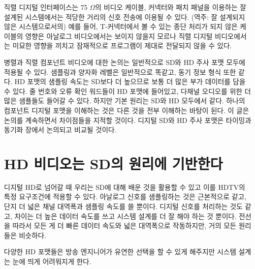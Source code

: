 직렬 디지털 인터페이스는 75 $\Omega$의 비디오 케이블, 커넥터와 패치 패널을 이용하는 잘 설계된 시스템에서는 적당한 거리의 신호 전송에 이용될 수 있다.
(역주: 잘 설계되지 않은 시스템으로서의) 예를 들어, T-커넥터에서 볼 수 있는 종단 처리가 되지 않은 케이블의 영향은 아날로그 비디오에서는 보이지 않을지 모르나 직렬 디지털 비디오에서는 미묘한 영향을 끼치고 잠재적으로 프로그램이 제대로 전달되지 않을 수 있다.

병렬과 직렬 컴포넌트 비디오에 대한 논의는 일반적으로 SD와 HD 주사 포맷 모두에 적용될 수 있다. 샘플링과 양자화 레벨은 일반적으로 똑같고, 동기 정보 형식 또한 같다. HD 포맷의 샘플링 속도는 SD보다 더 높으므로 보통 더 많은 부가 데이터를 담을 수 있다.
줄 번호와 오류 확인 워드들이 HD 포맷에 들어있고, 다채널 오디오를 위한 더 많은 샘플들도 들어갈 수 있다. 하지만 기본 원리는 SD와 HD 모두에서 같다. 하나의 컴포넌트 디지털 포맷을 이해하는 것은 다른 것을 전부 이해하는 바탕이 된다.
이 글은 논의를 계속하면서 차이점들을 지적할 것이다. 디지털 SD와 HD 주사 포맷은 타이밍과 동기화 장에서 논의되고 비교될 것이다.

\section{HD 비디오는 SD의 원리에 기반한다}
디지털 HD로 넘어갈 때 우리는 SD에 대해 배운 것을 활용할 수 있고 이를 HDTV의 특정 요구조건에 적용할 수 있다. 아날로그 신호를 샘플링하는 것은 근본적으로 같고, 단지 더 넓은 채널 대역폭과 샘플링 속도를 쓸 뿐이다.
디지털 신호를 처리하는 것도 같고, 차이는 더 높은 데이터 속도를 쓰고 시스템 설계를 더 잘 해야 하는 것 뿐이다. 전선을 따라서 모든 게 더 빠른 데이터 속도와 넓은 대역폭으로 작동하지만, 거의 모든 원리들은 비슷하다.


다양한 HD 포맷들은 방송 엔지니어가 유연한 선택을 할 수 있게 해주지만 시스템 설계는 눈에 띄게 어려워지게 한다.

